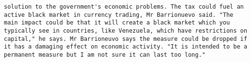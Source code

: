 \documentclass[11pt]{article}
\begin{document}
\begin{Verbatim}[commandchars=\\\{\}]
solution to the government's economic problems. The tax could fuel an active black market in currency trading, Mr Barrionuevo said. "The main impact could be that it will create a black market which you typically see in countries, like Venezuela, which have restrictions on capital," he says. Mr Barrioneuvo says the measure could be dropped if it has a damaging effect on economic activity. "It is intended to be a permanent measure but I am not sure it can last too long."                                                                                                                                                                                                                                                                                                                                                                                                                                                                                                                                                                                                                                                                                                                                                                                                                                                                                                                                                                                                                                                                                                                                                                                                                                                                                                                                                                                                      

\end{Verbatim}
\end{document}
